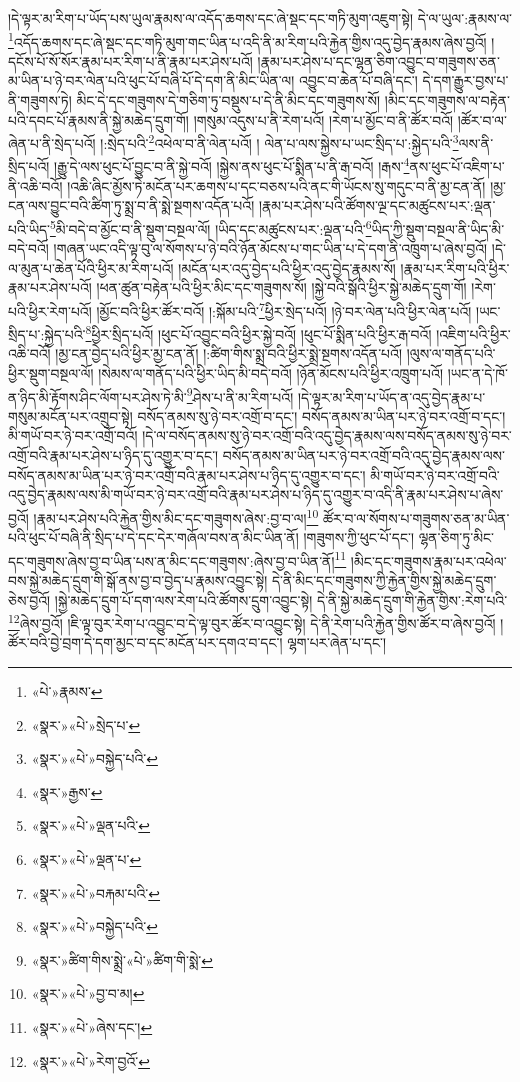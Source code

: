 །དེ་ལྟར་མ་རིག་པ་ཡོད་པས་ཡུལ་རྣམས་ལ་འདོད་ཆགས་དང་ཞེ་སྡང་དང་གཏི་མུག་འཇུག་སྟེ། དེ་ལ་ཡུལ་:རྣམས་ལ་\footnote{«པེ་»རྣམས་}འདོད་ཆགས་དང་ཞེ་སྡང་དང་གཏི་མུག་གང་ཡིན་པ་འདི་ནི་མ་རིག་པའི་རྐྱེན་གྱིས་འདུ་བྱེད་རྣམས་ཞེས་བྱའོ། །དངོས་པོ་སོ་སོར་རྣམ་པར་རིག་པ་ནི་རྣམ་པར་ཤེས་པའོ། །རྣམ་པར་ཤེས་པ་དང་ལྷན་ཅིག་འབྱུང་བ་གཟུགས་ཅན་མ་ཡིན་པ་ཉེ་བར་ལེན་པའི་ཕུང་པོ་བཞི་པོ་དེ་དག་ནི་མིང་ཡིན་ལ། འབྱུང་བ་ཆེན་པོ་བཞི་དང་། དེ་དག་རྒྱུར་བྱས་པ་ནི་གཟུགས་ཏེ། མིང་དེ་དང་གཟུགས་དེ་གཅིག་ཏུ་བསྡུས་པ་དེ་ནི་མིང་དང་གཟུགས་སོ། །མིང་དང་གཟུགས་ལ་བརྟེན་པའི་དབང་པོ་རྣམས་ནི་སྐྱེ་མཆེད་དྲུག་གོ། །གསུམ་འདུས་པ་ནི་རེག་པའོ། །རེག་པ་མྱོང་བ་ནི་ཚོར་བའོ། །ཚོར་བ་ལ་ཞེན་པ་ནི་སྲེད་པའོ། །:སྲེད་པའི་\footnote{«སྣར་»«པེ་»སྲེད་པ་}འཕེལ་བ་ནི་ལེན་པའོ། །
ལེན་པ་ལས་སྐྱེས་པ་ཡང་སྲིད་པ་:སྐྱེད་པའི་\footnote{«སྣར་»«པེ་»བསྐྱེད་པའི་}ལས་ནི་སྲིད་པའོ། །རྒྱུ་དེ་ལས་ཕུང་པོ་བྱུང་བ་ནི་སྐྱེ་བའོ། །སྐྱེས་ནས་ཕུང་པོ་སྨིན་པ་ནི་རྒ་བའོ། །རྒས་\footnote{«སྣར་»རྒྱས་}ནས་ཕུང་པོ་འཇིག་པ་ནི་འཆི་བའོ། །འཆི་ཞིང་མྱོས་ཏེ་མངོན་པར་ཆགས་པ་དང་བཅས་པའི་ནང་གི་ཡོངས་སུ་གདུང་བ་ནི་མྱ་ངན་ནོ། །མྱ་ངན་ལས་བྱུང་བའི་ཚིག་ཏུ་སྨྲ་བ་ནི་སྨེ་སྔགས་འདོན་པའོ། །རྣམ་པར་ཤེས་པའི་ཚོགས་ལྔ་དང་མཚུངས་པར་:ལྡན་པའི་ཡིད་\footnote{«སྣར་»«པེ་»ལྡན་པའི་}མི་བདེ་བ་མྱོང་བ་ནི་སྡུག་བསྔལ་ལོ། །ཡིད་དང་མཚུངས་པར་:ལྡན་པའི་\footnote{«སྣར་»«པེ་»ལྡན་པ་}ཡིད་ཀྱི་སྡུག་བསྔལ་ནི་ཡིད་མི་བདེ་བའོ། །གཞན་ཡང་འདི་ལྟ་བུ་ལ་སོགས་པ་ཉེ་བའི་ཉོན་མོངས་པ་གང་ཡིན་པ་དེ་དག་ནི་འཁྲུག་པ་ཞེས་བྱའོ། །དེ་ལ་མུན་པ་ཆེན་པོའི་ཕྱིར་མ་རིག་པའོ། །མངོན་པར་འདུ་བྱེད་པའི་ཕྱིར་འདུ་བྱེད་རྣམས་སོ། །རྣམ་པར་རིག་པའི་ཕྱིར་རྣམ་པར་ཤེས་པའོ། །ཕན་ཚུན་བརྟེན་པའི་ཕྱིར་མིང་དང་གཟུགས་སོ། །སྐྱེ་བའི་སྒོའི་ཕྱིར་སྐྱེ་མཆེད་དྲུག་གོ། །རེག་པའི་ཕྱིར་རེག་པའོ། །མྱོང་བའི་ཕྱིར་ཚོར་བའོ། །:སྐོམ་པའི་\footnote{«སྣར་»«པེ་»བརྐམ་པའི་}ཕྱིར་སྲེད་པའོ། །ཉེ་བར་ལེན་པའི་ཕྱིར་ལེན་པའོ། །ཡང་སྲིད་པ་:སྐྱེད་པའི་\footnote{«སྣར་»«པེ་»བསྐྱེད་པའི་}ཕྱིར་སྲིད་པའོ། །ཕུང་པོ་འབྱུང་བའི་ཕྱིར་སྐྱེ་བའོ། །ཕུང་པོ་སྨིན་པའི་ཕྱིར་རྒ་བའོ། །འཇིག་པའི་ཕྱིར་འཆི་བའོ། །མྱ་ངན་བྱེད་པའི་ཕྱིར་མྱ་ངན་ནོ། །:ཚིག་གིས་སྨྲ་བའི་ཕྱིར་སྨྲེ་སྔགས་འདོན་པའོ། །ལུས་ལ་གནོད་པའི་ཕྱིར་སྡུག་བསྔལ་ལོ། །སེམས་ལ་གནོད་པའི་ཕྱིར་ཡིད་མི་བདེ་བའོ། །ཉོན་མོངས་པའི་ཕྱིར་འཁྲུག་པའོ། །ཡང་ན་དེ་ཁོ་ན་ཉིད་མི་རྟོགས་ཤིང་ལོག་པར་ཤེས་ཏེ་མི་\footnote{«སྣར་»ཚིག་གིས་སྨྲེ་«པེ་»ཚིག་གི་སྨེ་}ཤེས་པ་ནི་མ་རིག་པའོ། །དེ་ལྟར་མ་རིག་པ་ཡོད་ན་འདུ་བྱེད་རྣམ་པ་གསུམ་མངོན་པར་འགྲུབ་སྟེ། བསོད་ནམས་སུ་ཉེ་བར་འགྲོ་བ་དང་། བསོད་ནམས་མ་ཡིན་པར་ཉེ་བར་འགྲོ་བ་དང་། མི་གཡོ་བར་ཉེ་བར་འགྲོ་བའོ། །དེ་ལ་བསོད་ནམས་སུ་ཉེ་བར་འགྲོ་བའི་འདུ་བྱེད་རྣམས་ལས་བསོད་ནམས་སུ་ཉེ་བར་འགྲོ་བའི་རྣམ་པར་ཤེས་པ་ཉིད་དུ་འགྱུར་བ་དང་། བསོད་ནམས་མ་ཡིན་པར་ཉེ་བར་འགྲོ་བའི་འདུ་བྱེད་རྣམས་ལས་བསོད་ནམས་མ་ཡིན་པར་ཉེ་བར་འགྲོ་བའི་རྣམ་པར་ཤེས་པ་ཉིད་དུ་འགྱུར་བ་དང་། མི་གཡོ་བར་ཉེ་བར་འགྲོ་བའི་འདུ་བྱེད་རྣམས་ལས་མི་གཡོ་བར་ཉེ་བར་འགྲོ་བའི་རྣམ་པར་ཤེས་པ་ཉིད་དུ་འགྱུར་བ་འདི་ནི་རྣམ་པར་ཤེས་པ་ཞེས་བྱའོ། །རྣམ་པར་ཤེས་པའི་རྐྱེན་གྱིས་མིང་དང་གཟུགས་ཞེས་:བྱ་བ་ལ།\footnote{«སྣར་»«པེ་»བྱ་བ་མ།} ཚོར་བ་ལ་སོགས་པ་གཟུགས་ཅན་མ་ཡིན་པའི་ཕུང་པོ་བཞི་ནི་སྲིད་པ་དེ་དང་དེར་གཞོལ་བས་ན་མིང་ཡིན་ནོ། །གཟུགས་ཀྱི་ཕུང་པོ་དང་། ལྷན་ཅིག་ཏུ་མིང་དང་གཟུགས་ཞེས་བྱ་བ་ཡིན་པས་ན་མིང་དང་གཟུགས་:ཞེས་བྱ་བ་ཡིན་ནོ།\footnote{«སྣར་»«པེ་»ཞེས་དང་།} །མིང་དང་གཟུགས་རྣམ་པར་འཕེལ་བས་སྐྱེ་མཆེད་དྲུག་གི་སྒོ་ནས་བྱ་བ་བྱེད་པ་རྣམས་འབྱུང་སྟེ། དེ་ནི་མིང་དང་གཟུགས་ཀྱི་རྐྱེན་གྱིས་སྐྱེ་མཆེད་དྲུག་ཅེས་བྱའོ། །སྐྱེ་མཆེད་དྲུག་པོ་དག་ལས་རེག་པའི་ཚོགས་དྲུག་འབྱུང་སྟེ། དེ་ནི་སྐྱེ་མཆེད་དྲུག་གི་རྐྱེན་གྱིས་:རེག་པའི་\footnote{«སྣར་»«པེ་»རེག་བྱའོ་}ཞེས་བྱའོ། །ཇི་ལྟ་བུར་རེག་པ་འབྱུང་བ་དེ་ལྟ་བུར་ཚོར་བ་འབྱུང་སྟེ། དེ་ནི་རེག་པའི་རྐྱེན་གྱིས་ཚོར་བ་ཞེས་བྱའོ། །ཚོར་བའི་བྱེ་བྲག་དེ་དག་མྱང་བ་དང་མངོན་པར་དགའ་བ་དང་། ལྷག་པར་ཞེན་པ་དང་། 